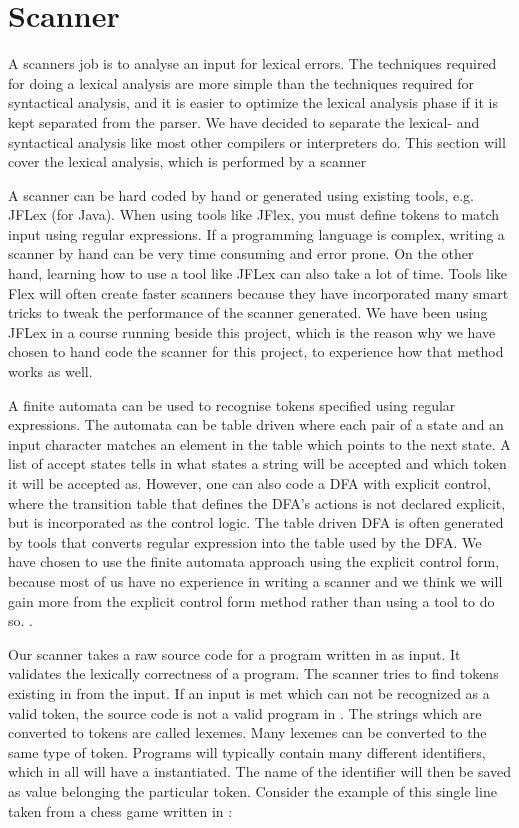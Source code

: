 \section{Scanner}
A scanners job is to analyse an input for lexical errors. The techniques required for doing a lexical analysis are more simple than the techniques required for syntactical analysis, and it is easier to optimize the lexical analysis phase if it is kept separated from the parser. We have decided to separate the lexical- and syntactical analysis like most other compilers or interpreters do. This section will cover the lexical analysis, which is performed by a scanner\cite[p.189]{sebesta2013}

A scanner can be hard coded by hand or generated using existing tools, e.g. JFLex (for Java). When using tools like JFlex, you must define tokens to match input using regular expressions. If a programming language is complex, writing a scanner by hand can be very time consuming and error prone. On the other hand, learning how to use a tool like JFLex can also take a lot of time. Tools like Flex will often create faster scanners because they have incorporated many smart tricks to tweak the performance of the scanner generated\cite[p.116]{fischer2009}.
 We have been using JFLex in a course running beside this project, which is the reason why we have chosen to hand code the scanner for this project, to experience how that method works as well.
 
A finite automata can be used to recognise tokens specified using regular expressions. The automata can be table driven where each pair of a state and an input character matches an element in the table which points to the next state. A list of accept states tells in what states a string will be accepted and which token it will be accepted as. However, one can also code a DFA with explicit control, where the transition table that defines the DFA's actions is not declared explicit, but is incorporated as the control logic. The table driven DFA is often generated by tools that converts regular expression into the table used by the DFA. We have chosen to use the finite automata approach using the explicit control form, because most of us have no experience in writing a scanner and we think we will gain more from the explicit control form method rather than using a tool to do so.
\cite[p.94]{fischer2009}.

Our scanner takes a raw source code for a program written in \productname{} as input. It validates the lexically correctness of a \productname{} program. The scanner tries to find tokens existing in \productname{} from the input. If an input is met which can not be recognized as a valid token, the source code is not a valid program in \productname{}.
 The strings which are converted to tokens are called lexemes. Many lexemes can be converted to the same type of token. Programs will typically contain many different identifiers, which in \productname{} all will have a  instantiated. The name of the identifier will then be saved as value belonging the particular token. Consider the example of this single line taken from a chess game written in \productname{}:
 
